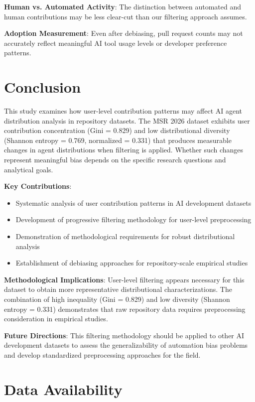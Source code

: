 \documentclass[conference]{IEEEtran}
\begin{document}
\textbf{Human vs. Automated Activity}: The distinction between automated and human contributions may be less clear-cut than our filtering approach assumes.

\textbf{Adoption Measurement}: Even after debiasing, pull request counts may not accurately reflect meaningful AI tool usage levels or developer preference patterns.

\section{Conclusion}

This study examines how user-level contribution patterns may affect AI agent distribution analysis in repository datasets. The MSR 2026 dataset exhibits user contribution concentration (Gini = 0.829) and low distributional diversity (Shannon entropy = 0.769, normalized = 0.331) that produces measurable changes in agent distributions when filtering is applied. Whether such changes represent meaningful bias depends on the specific research questions and analytical goals.

\textbf{Key Contributions}:
\begin{itemize}
    \item Systematic analysis of user contribution patterns in AI development datasets
    \item Development of progressive filtering methodology for user-level preprocessing  
    \item Demonstration of methodological requirements for robust distributional analysis
    \item Establishment of debiasing approaches for repository-scale empirical studies
\end{itemize}

\textbf{Methodological Implications}: User-level filtering appears necessary for this dataset to obtain more representative distributional characterizations. The combination of high inequality (Gini = 0.829) and low diversity (Shannon entropy = 0.331) demonstrates that raw repository data requires preprocessing consideration in empirical studies.

\textbf{Future Directions}: This filtering methodology should be applied to other AI development datasets to assess the generalizability of automation bias problems and develop standardized preprocessing approaches for the field.

\section*{Data Availability}
\end{document}
